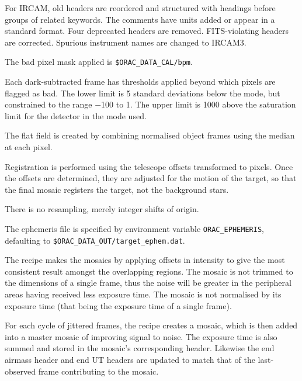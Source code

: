 \documentclass[twoside,11pt,nolof]{starlink}
\begin{document}
{{{         \sstitem
         For IRCAM, old headers are reordered and structured with
         headings before groups of related keywords.  The comments have
         units added or appear in a standard format.  Four deprecated
         headers are removed.  FITS-violating headers are corrected.
         Spurious instrument names are changed to IRCAM3.

         \sstitem
         The bad pixel mask applied is {\tt\$ORAC\_DATA\_CAL/bpm}.

         \sstitem
         Each dark-subtracted frame has thresholds applied beyond which
         pixels are flagged as bad.  The lower limit is 5 standard
         deviations below the mode, but constrained to the range $-$100 to 1.
         The upper limit is 1000 above the saturation limit for the detector
         in the mode used.

         \sstitem
         The flat field is created by combining normalised object
         frames using the median at each pixel.

         \sstitem
         Registration is performed using the telescope offsets
         transformed to pixels.  Once the offsets are determined, they
         are adjusted for the motion of the target, so that the final
         mosaic registers the target, not the background stars.

         \sstitem
         There is no resampling, merely integer shifts of origin.

         \sstitem
         The ephemeris file is specified by environment variable
         {\tt{ORAC\_EPHEMERIS}}, defaulting to \texttt{\$ORAC\_DATA\_OUT/target\_ephem.dat}.

         \sstitem
         The recipe makes the mosaics by applying offsets in intensity
         to give the most consistent result amongst the overlapping regions.
         The mosaic is not trimmed to the dimensions of a single frame, thus
         the noise will be greater in the peripheral areas having received
         less exposure time.  The mosaic is not normalised by its exposure
         time (that being the exposure time of a single frame).

         \sstitem
         For each cycle of jittered frames, the recipe creates a mosaic,
         which is then added into a master mosaic of improving signal to
         noise.  The exposure time is also summed and stored in the
	 mosaic's corresponding header.  Likewise the end airmass
	 header and end UT headers are updated to match that of the
	 last-observed frame contributing to the mosaic.

}}}
\end{document}
